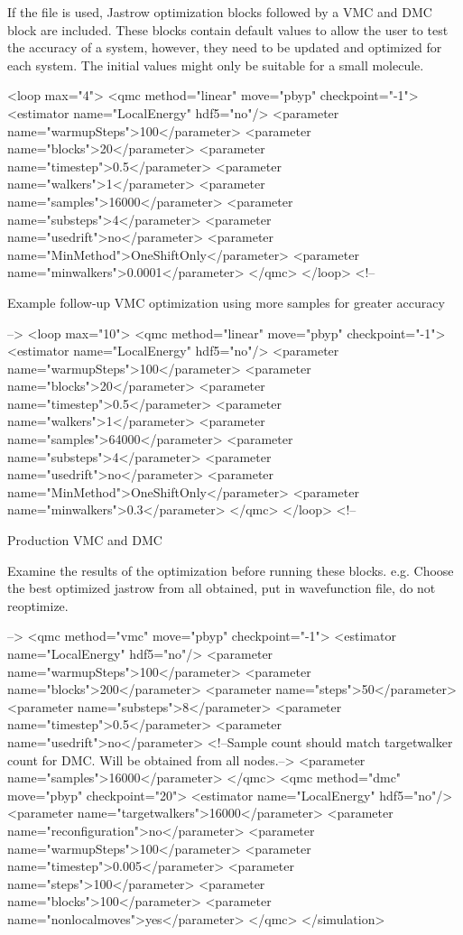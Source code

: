 \begin{itemize}
If the  file is used, Jastrow optimization
blocks followed by a VMC and DMC block are included. These blocks
contain default values to allow the user to test the accuracy of a
system, however, they need to be updated and optimized for each
system. The initial values might only be suitable for a small molecule.

\begin{shade}
  <loop max="4">
    <qmc method="linear" move="pbyp" checkpoint="-1">
      <estimator name="LocalEnergy" hdf5="no"/>
      <parameter name="warmupSteps">100</parameter>
      <parameter name="blocks">20</parameter>
      <parameter name="timestep">0.5</parameter>
      <parameter name="walkers">1</parameter>
      <parameter name="samples">16000</parameter>
      <parameter name="substeps">4</parameter>
      <parameter name="usedrift">no</parameter>
      <parameter name="MinMethod">OneShiftOnly</parameter>
      <parameter name="minwalkers">0.0001</parameter>
    </qmc>
  </loop>
  <!--
 
Example follow-up VMC optimization using more samples for greater accuracy

-->
  <loop max="10">
    <qmc method="linear" move="pbyp" checkpoint="-1">
      <estimator name="LocalEnergy" hdf5="no"/>
      <parameter name="warmupSteps">100</parameter>
      <parameter name="blocks">20</parameter>
      <parameter name="timestep">0.5</parameter>
      <parameter name="walkers">1</parameter>
      <parameter name="samples">64000</parameter>
      <parameter name="substeps">4</parameter>
      <parameter name="usedrift">no</parameter>
      <parameter name="MinMethod">OneShiftOnly</parameter>
      <parameter name="minwalkers">0.3</parameter>
    </qmc>
  </loop>
  <!--

Production VMC and DMC

Examine the results of the optimization before running these blocks.
e.g. Choose the best optimized jastrow from all obtained, put in 
wavefunction file, do not reoptimize.

-->
  <qmc method="vmc" move="pbyp" checkpoint="-1">
    <estimator name="LocalEnergy" hdf5="no"/>
    <parameter name="warmupSteps">100</parameter>
    <parameter name="blocks">200</parameter>
    <parameter name="steps">50</parameter>
    <parameter name="substeps">8</parameter>
    <parameter name="timestep">0.5</parameter>
    <parameter name="usedrift">no</parameter>
    <!--Sample count should match targetwalker count for 
      DMC. Will be obtained from all nodes.-->
    <parameter name="samples">16000</parameter>
  </qmc>
  <qmc method="dmc" move="pbyp" checkpoint="20">
    <estimator name="LocalEnergy" hdf5="no"/>
    <parameter name="targetwalkers">16000</parameter>
    <parameter name="reconfiguration">no</parameter>
    <parameter name="warmupSteps">100</parameter>
    <parameter name="timestep">0.005</parameter>
    <parameter name="steps">100</parameter>
    <parameter name="blocks">100</parameter>
    <parameter name="nonlocalmoves">yes</parameter>
  </qmc>
</simulation>


\end{shade}
\end{itemize}
